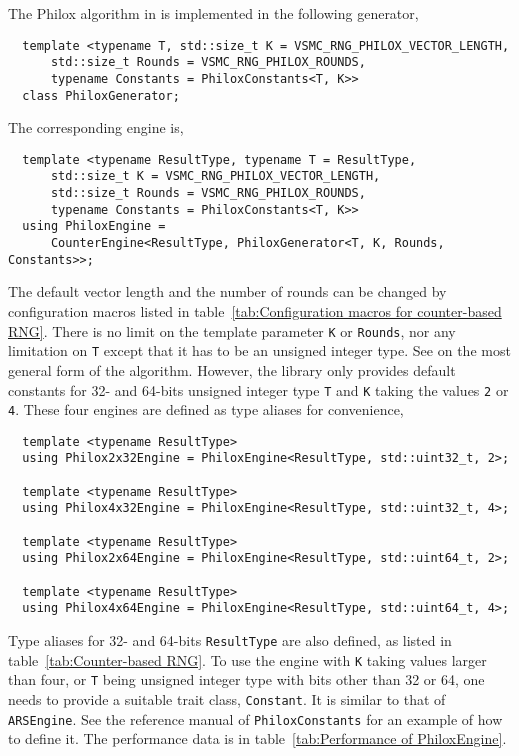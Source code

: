 The Philox algorithm in \textcite{Salmon:2011um} is implemented in the
following generator,
\begin{Verbatim}
  template <typename T, std::size_t K = VSMC_RNG_PHILOX_VECTOR_LENGTH,
      std::size_t Rounds = VSMC_RNG_PHILOX_ROUNDS,
      typename Constants = PhiloxConstants<T, K>>
  class PhiloxGenerator;
\end{Verbatim}
The corresponding \rng engine is,
\begin{Verbatim}
  template <typename ResultType, typename T = ResultType,
      std::size_t K = VSMC_RNG_PHILOX_VECTOR_LENGTH,
      std::size_t Rounds = VSMC_RNG_PHILOX_ROUNDS,
      typename Constants = PhiloxConstants<T, K>>
  using PhiloxEngine =
      CounterEngine<ResultType, PhiloxGenerator<T, K, Rounds, Constants>>;
\end{Verbatim}
The default vector length and the number of rounds can be changed by
configuration macros listed in table~\ref{tab:Configuration macros for
  counter-based RNG}. There is no limit on the template parameter \verb|K| or
\verb|Rounds|, nor any limitation on \verb|T| except that it has to be an
unsigned integer type. See \textcite{Salmon:2011um} on the most general form of
the algorithm. However, the library only provides default constants for 32- and
64-bits unsigned integer type \verb|T| and \verb|K| taking the values \verb|2|
or \verb|4|. These four engines are defined as type aliases for convenience,
\begin{Verbatim}
  template <typename ResultType>
  using Philox2x32Engine = PhiloxEngine<ResultType, std::uint32_t, 2>;

  template <typename ResultType>
  using Philox4x32Engine = PhiloxEngine<ResultType, std::uint32_t, 4>;

  template <typename ResultType>
  using Philox2x64Engine = PhiloxEngine<ResultType, std::uint64_t, 2>;

  template <typename ResultType>
  using Philox4x64Engine = PhiloxEngine<ResultType, std::uint64_t, 4>;
\end{Verbatim}
Type aliases for 32- and 64-bits \verb|ResultType| are also defined, as listed
in table~\ref{tab:Counter-based RNG}. To use the engine with \verb|K| taking
values larger than four, or \verb|T| being unsigned integer type with bits
other than 32 or 64, one needs to provide a suitable trait class,
\verb|Constant|. It is similar to that of \verb|ARSEngine|. See the reference
manual of \verb|PhiloxConstants| for an example of how to define it. The
performance data is in table~\ref{tab:Performance of PhiloxEngine}.

